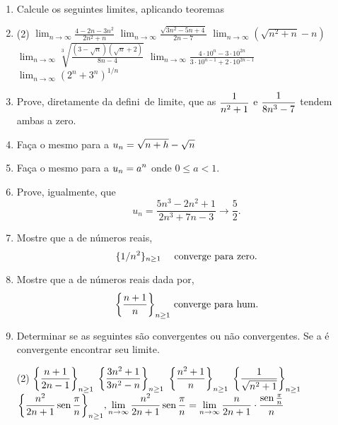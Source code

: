 \begin{enumerate}[label=\rm{(\arabic*)}]
\item Calcule os seguintes limites, aplicando teoremas
\item 
\begin{tasks}[label=\rm{(\alph*)},item-indent=4em,label-width=4ex,ref=\rm{(\alph*)}](2)
\task  \(\displaystyle{\lim_{n\to\infty}\frac{4-2n-3n^2}{2n^2+n}}\)
\task  \(\displaystyle{ \lim_{n\to\infty}\frac{\sqrt{3n^2-5n+4}}{2n-7}}\)
\task  \(\displaystyle{\lim_{n\to\infty}\left(\sqrt{n^2+n}-n\right)}\)
\task  \(\displaystyle{\lim_{n\to\infty}\sqrt[3]{\frac{(3-\sqrt{n})(\sqrt{n}+2)}{8n-4}}}\)
\task  \(\displaystyle{\lim_{n\to \infty}\frac{4\cdot10^n-3\cdot10^{2n}}{3\cdot10^{n-1}+2\cdot10^{2n-1}}}\)
\task  \(\displaystyle{\lim_{n\to\infty} (2^n+3^n)^{1/n}}\)
\end{tasks}

\item Prove, diretamente da defini\cao\ de limite, que as \seqs
$\displaystyle{\frac{1}{n^2+1}}$ e $\displaystyle{\frac{1}{8n^3-7}}$ tendem ambas a zero.
\item Fa\c ca o mesmo para a \seq $\displaystyle{u_n=\sqrt{n+h}-\sqrt{n}}$
\item Fa\c ca o mesmo para a \seq $\displaystyle{u_n=a^n}$ onde $0\leq a<1$.
\item Prove, igualmente, que
\begin{equation*}
  u_n=\frac{5n^3-2n^2+1}{2n^3+7n-3}\to \frac{5}{2}.
\end{equation*}
\item Mostre que a \seq de n\'{u}meros reais,
\begin{equation*}
  \displaystyle{\{1/n^2 \}_{n\geq 1}} \quad \text{ converge para zero.}
\end{equation*}
\item Mostre que a \seq de n\'{u}meros reais dada por,
\begin{equation*}
  \displaystyle{\left\{\frac{n+1}{n}\right\}_{n\geq 1}}  \text{ converge para hum.}
\end{equation*}
\item Determinar se as seguintes \seqs s\~{a}o convergentes ou n\~{a}o
  convergentes. Se a \seq \'{e} convergente encontrar seu limite.
\begin{tasks}[label=\rm{(\alph*)},item-indent=4em,label-width=4ex,ref=\rm{(\alph*)}](2)
\task  \(\displaystyle{\left\{\frac{n+1}{2n-1}\right\}_{n\geq 1}}\)
\task  \(\displaystyle{\left\{\frac{3n^2+1}{3n^2-n}\right\}_{n\geq 1}}\)
\task  \(\displaystyle{\left\{\frac{n^2+1}{n}\right\}_{n\geq 1}}\)
\task  \(\displaystyle{\left\{\frac{1}{\sqrt{n^2+1}}\right\}_{n\geq 1}}\)
\task  \(\displaystyle{\left\{\frac{n^2}{2n+1}\operatorname{sen}\frac{\pi}{n}\right\}_{n\geq 1}},\displaystyle{\lim_{n\to\infty}\frac{n^2}{2n+1}\operatorname{sen}\frac{\pi}{n}=
\lim_{n\to\infty}\frac{n}{2n+1}\cdot\frac{\operatorname{sen}\frac{\pi}{n}}{n}}\)

\end{tasks}
\end{enumerate}
